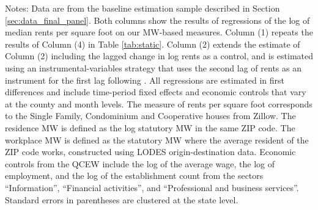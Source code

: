 \begin{table}[hbt!]
    \begin{minipage}{.95\textwidth} \footnotesize
        \vspace{2mm}
        Notes: 
        Data are from the baseline estimation sample described in Section 
        \ref{sec:data_final_panel}.
        Both columns show the results of regressions of the log of 
        median rents per square foot on our MW-based measures.
        Column (1) repeats the results of Column (4) in Table \ref{tab:static}.
        Column (2) extends the estimate of Column (2) including the lagged 
        change in log rents as a control, and is estimated using an 
        instrumental-variables strategy that uses the second lag of rents
        as an instrument for the first lag following \textcite{ArellanoBond1991}.
        All regressions are estimated in first differences and include 
        time-period fixed effects and economic controls that vary at the 
        county and month levels.
        The measure of rents per square foot corresponds to the Single Family, 
        Condominium and Cooperative houses from Zillow.
        The residence MW is defined as the log statutory MW in the same ZIP code.
        The workplace MW is defined as the statutory MW where the average 
        resident of the ZIP code works, constructed using LODES 
        origin-destination data.
        Economic controls from the QCEW include the log of the average wage, 
        the log of employment, and the log of the establishment count from the 
        sectors ``Information'', ``Financial activities'', and ``Professional
        and business services''.
        Standard errors in parentheses are clustered at the state level.
    \end{minipage}
\end{table}
